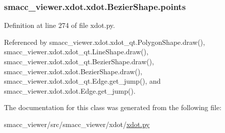 \subsubsection[{\texorpdfstring{points}{points}}]{\setlength{\rightskip}{0pt plus 5cm}smacc\+\_\+viewer.\+xdot.\+xdot.\+Bezier\+Shape.\+points}\hypertarget{classsmacc__viewer_1_1xdot_1_1xdot_1_1BezierShape_a73bc6ef056c4dff80f8ae562768ad32c}{}\label{classsmacc__viewer_1_1xdot_1_1xdot_1_1BezierShape_a73bc6ef056c4dff80f8ae562768ad32c}


Definition at line 274 of file xdot.\+py.



Referenced by smacc\+\_\+viewer.\+xdot.\+xdot\+\_\+qt.\+Polygon\+Shape.\+draw(), smacc\+\_\+viewer.\+xdot.\+xdot\+\_\+qt.\+Line\+Shape.\+draw(), smacc\+\_\+viewer.\+xdot.\+xdot\+\_\+qt.\+Bezier\+Shape.\+draw(), smacc\+\_\+viewer.\+xdot.\+xdot.\+Bezier\+Shape.\+draw(), smacc\+\_\+viewer.\+xdot.\+xdot\+\_\+qt.\+Edge.\+get\+\_\+jump(), and smacc\+\_\+viewer.\+xdot.\+xdot.\+Edge.\+get\+\_\+jump().



The documentation for this class was generated from the following file\+:\begin{DoxyCompactItemize}
\item 
smacc\+\_\+viewer/src/smacc\+\_\+viewer/xdot/\hyperlink{xdot_8py}{xdot.\+py}\end{DoxyCompactItemize}
